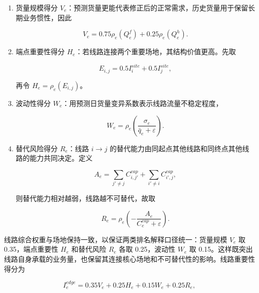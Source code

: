 \documentclass[UTF8,zihao=-4,a4paper,fontset=fandol]{ctexart}
\begin{document}
\begin{enumerate}

\item 货量规模得分 $V_e$：预测货量更能代表修正后的正常需求，历史货量用于保留长期业务惯性，因此

\begin{equation}
V_e=0.75\rho_e(Q_e^f)+0.25\rho_e(Q_e^h).
\end{equation}

\item 端点重要性得分 $H_e$：若线路连接两个重要场地，其结构价值更高。先取

\begin{equation}
E_{i,j}=0.5I_i^{site}+0.5I_j^{site},
\end{equation}

再令 $H_e=\rho_e(E_{i,j})$。

\item 波动性得分 $W_e$：用预测日货量变异系数表示线路流量不稳定程度，

\begin{equation}
W_e=\rho_e\left(\frac{\sigma_e}{\bar q_e+\varepsilon}\right).
\end{equation}

\item 替代风险得分 $R_e$：线路 $i\to j$ 的替代能力由同起点其他线路和同终点其他线路的能力共同决定。定义

\begin{equation}
A_e=\sum_{j'\ne j}C_{i,j'}^{cap}+\sum_{i'\ne i}C_{i',j}^{cap},
\end{equation}

则替代能力相对越弱，线路越不可替代，故取

\begin{equation}
R_e=\rho_e\left(-\frac{A_e}{C_e^{cap}+\varepsilon}\right).
\end{equation}

\end{enumerate}



线路综合权重与场地保持一致，以保证两类排名解释口径统一：货量规模 $V_e$ 取 0.35，端点重要性 $H_e$ 和替代风险 $R_e$ 各取 0.25，波动性 $W_e$ 取 0.15。这样既突出线路自身承载的业务量，也保留其连接核心场地和不可替代性的影响。线路重要性得分为



\begin{equation}
I_e^{edge}=0.35V_e+0.25H_e+0.15W_e+0.25R_e,
\end{equation}
\end{document}
